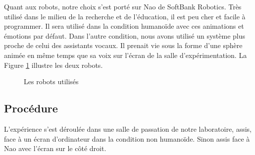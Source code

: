 \documentclass{article}
\begin{document}
Quant aux robots, notre choix s'est porté sur Nao de SoftBank Robotics. Très utilisé dans le milieu de la recherche et de l'éducation, il est peu cher et facile à programmer. Il sera utilisé dans la condition humanoïde avec ces animations et émotions par défaut. Dans l'autre condition, nous avons utilisé un système plus proche de celui des assistants vocaux. Il prenait vie sous la forme d'une sphère animée en même temps que sa voix sur l'écran de la salle d'expérimentation. La Figure \ref{jarvis} illustre les deux robots.

\begin{figure}[!htbp]
    \centering
    \qquad
    \caption{Les robots utilisés}
    \label{jarvis}
\end{figure}

\subsection{Procédure} \hypertarget{procedure}{}
L'expérience s'est déroulée dans une salle de passation de notre laboratoire, assis, face à un écran d'ordinateur dans la condition non humanoïde. Sinon assis face à Nao avec l'écran sur le côté droit.
\end{document}
